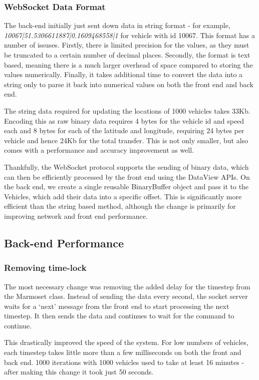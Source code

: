 \documentclass[ %
                    author={Alexander Hill},
                supervisor={Dr. Benjamin Sach},
                    degree={MEng},
                     title={MARMOSET},
                  subtitle={Multi-Agent Route Management using Online Simulation for Efficient Transportation},
                      type={research},
                      year={2016} ]{dissertation}
\begin{document}
\subsubsection{WebSocket Data Format}

The back-end initially just sent down data in string format - for example,
\textit{10067|51.5306611887|0.1609468558|1} for vehicle with id 10067. This
format has a number of issuses. Firstly, there is limited precision for the
values, as they must be truncated to a certain number of decimal places.
Secondly, the format is text based, meaning there is a much larger overhead of
space compared to storing the values numerically. Finally, it takes additional
time to convert the data into a string only to parse it back into numerical
values on both the front end and back end.

The string data required for updating the locations of 1000 vehicles takes 33Kb.
Encoding this as raw binary data requires 4 bytes for the vehicle id and speed
each and 8 bytes for each of the latitude and longitude, requiring 24 bytes per
vehicle and hence 24Kb for the total transfer.  This is not only smaller, but
also comes with a performance and accuracy improvement as well.

Thankfully, the WebSocket protocol supports the sending of binary data, which
can then be efficiently processed by the front end using the DataView APIs. On
the back end, we create a single reusable BinaryBuffer object and pass it to the
Vehicles, which add their data into a specific offset. This is significantly
more efficient than the string based method, although the change is primarily
for improving network and front end performance.

\subsection{Back-end Performance}

\subsubsection{Removing time-lock}

The most necessary change was removing the added delay for the timestep from the
Marmoset class. Instead of sending the data every second, the socket server
waits for a `next' message from the front end to start processing the next
timestep. It then sends the data and continues to wait for the command to
continue.

This drastically improved the speed of the system. For low numbers of vehicles,
each timestep takes little more than a few milliseconds on both the front and
back end. 1000 iterations with 1000 vehicles used to take at least 16 minutes -
after making this change it took just 50 seconds.
\end{document}
